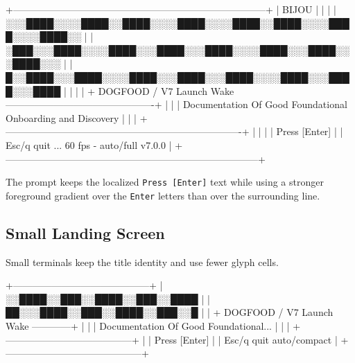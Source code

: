 \begin{CodeBlock}
+------------------------------------------------------------------------------+
|                         BIJOU                                                |
|                                                                              |
|  ░░░████░░░░████░░████░░░░████░░░░████░░████░░░░████░░░░████░░              |
|  ░███░░░████░░░░████░░░████░░░████░░░░████░░░████░░░████░░░                 |
|  █░░████░░░████░░░░████░░░████░░░████░░░░████░░░████░░░████                |
|                                                                              |
|  + DOGFOOD / V7 Launch Wake ----------------------------------------------+ |
|  | Documentation Of Good Foundational Onboarding and Discovery             | |
|  +-------------------------------------------------------------------------+ |
|                                                                              |
|                              Press [Enter]                                  |
| Esc/q quit ...                                      60 fps - auto/full v7.0.0 |
+------------------------------------------------------------------------------+
\end{CodeBlock}

The prompt keeps the localized \texttt{P\allowbreak{}r\allowbreak{}e\allowbreak{}s\allowbreak{}s\allowbreak{} \allowbreak{}[\allowbreak{}E\allowbreak{}n\allowbreak{}t\allowbreak{}e\allowbreak{}r\allowbreak{}]} text while using a stronger foreground gradient over the \texttt{E\allowbreak{}n\allowbreak{}t\allowbreak{}e\allowbreak{}r} letters than over the surrounding line.

\subsection{Small Landing Screen}\label{record-113-small-landing-screen}

Small terminals keep the title identity and use fewer glyph cells.

\begin{CodeBlock}
+------------------------------------------+
|    ░░████░░███░░████░░███░░████        |
|    ██░░░████░░███░░████░░███░░█        |
| + DOGFOOD / V7 Launch Wake ------------+ |
| | Documentation Of Good Foundational... | |
| +---------------------------------------+ |
|              Press [Enter]               |
| Esc/q quit                auto/compact    |
+------------------------------------------+
\end{CodeBlock}

